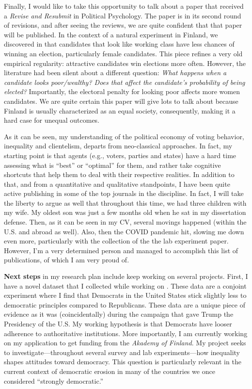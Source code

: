 \documentclass[10pt,stdletter,dateno,sigleft]{newlfm} %
\begin{document}
\begin{newlfm}
Finally, I would like to take this opportunity to talk about a paper that received a \emph{Revise and Resubmit} in Political Psychology. The paper is in its second round of revisions, and after seeing the reviews, we are quite confident that that paper will be published. In the context of a natural experiment in Finland, we discovered in \textcite{Bahamonde:2023} that candidates that look like working class have less chances of winning an election, particularly female candidates. This piece refines a very old empirical regularity: attractive candidates win elections more often. However, the literature had been silent about a different question: \emph{What happens when a candidate looks poor/wealthy? Does that affect the candidate's probability of being elected?} Importantly, the electoral penalty for looking poor affects more women candidates. We are quite certain this paper will give lots to talk about because Finland is usually characterized as an equal society, consequently, making it a hard case for unequal outcomes. 

As it can be seen, my understanding of the political economy of voting behavior, inequality and clientelism, departs from neo-classical approaches. In fact, my starting point is that agents (e.g., voters, parties and states) have a hard time assessing what is ``best'' or ``optimal'' for them, and rather take cognitive shortcuts that help them to deal with their respective realities. In addition to that, and from a quantitative and qualitative standpoints, I have been quite active publishing in some of the top journals in the discipline. In fact, I will take the liberty to argue as well that throughout this time, we had three children with my wife. My oldest son was just a few months old when he sat in my dissertation defense. Then, as it can be seen in my CV, several movings happened (within the U.S. and abroad as well). Also, then the COVID pandemic hit, slowing me down even more, particularly with the collection of the the lab experiment paper. However, I'm a very determined person and managed to accomplish this list of publications, of which I am very proud of. 

{\bf Next steps} in my research plan include keep working on several projects. First, I have a novel dataset that I collected while working on \textcite{Bahamonde2020a}. These data are a conjoint experiment where I find that Democrats in the United States stick slightly less to democratic principles compared to Republicans. These data are a unique piece of evidence as it was (coincidentally) during the campaign that gave Trump the Presidency of the U.S. My working hypothesis is that Democrats have looser adherence to authoritative institutions. More importantly, I am currently working on my application to get funding from the \emph{Akademy of Finland}. My project seeks to investigate---throughout several survey and lab experiments---how inequality shapes attitudes toward democracy. This question is particularly relevant in the current context of democratic erosion in many of the countries we once considered ``strongly democratic.''


\end{newlfm}
\end{document}
